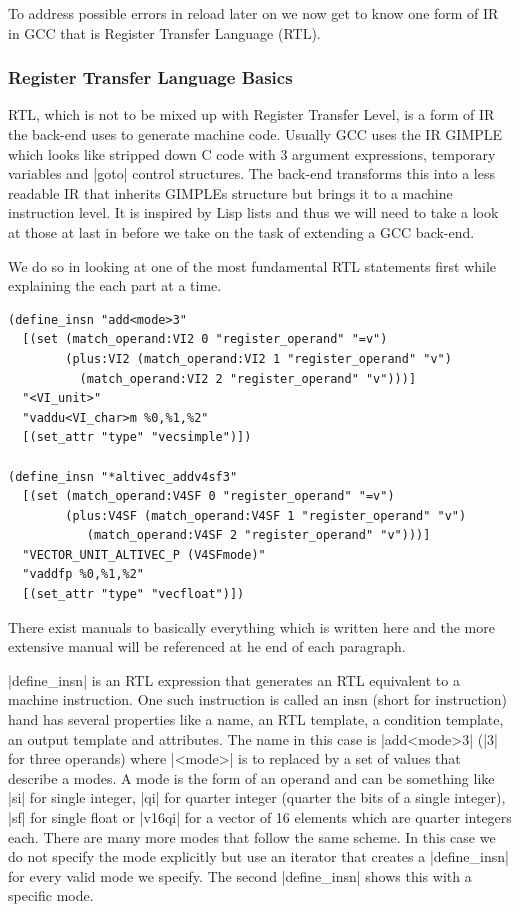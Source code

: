 To address possible errors in reload later on we now get to know one form of IR in GCC that is Register Transfer Language (RTL).

\subsubsection{Register Transfer Language Basics}
RTL, which is not to be mixed up with Register Transfer Level, is a form of IR the back-end uses to generate machine code.
Usually GCC uses the IR GIMPLE which looks like stripped down C code with 3 argument expressions, temporary variables and |goto| control structures.
The back-end transforms this into a less readable IR that inherits GIMPLEs structure but brings it to a machine instruction level.
It is inspired by Lisp lists and thus we will need to take a look at those at last in before we take on the task of extending a GCC back-end.

We do so in looking at one of the most fundamental RTL statements first while explaining the each part at a time.

\begin{lstlisting}
(define_insn "add<mode>3"
  [(set (match_operand:VI2 0 "register_operand" "=v")
        (plus:VI2 (match_operand:VI2 1 "register_operand" "v")
		  (match_operand:VI2 2 "register_operand" "v")))]
  "<VI_unit>"
  "vaddu<VI_char>m %0,%1,%2"
  [(set_attr "type" "vecsimple")])

(define_insn "*altivec_addv4sf3"
  [(set (match_operand:V4SF 0 "register_operand" "=v")
        (plus:V4SF (match_operand:V4SF 1 "register_operand" "v")
		   (match_operand:V4SF 2 "register_operand" "v")))]
  "VECTOR_UNIT_ALTIVEC_P (V4SFmode)"
  "vaddfp %0,%1,%2"
  [(set_attr "type" "vecfloat")])
\end{lstlisting}

There exist manuals to basically everything which is written here and the more extensive manual will be referenced at he end of each paragraph.

|define_insn| is an RTL expression that generates an RTL equivalent to a machine instruction.
One such instruction is called an insn (short for instruction) hand has several properties like a name, an RTL template, a condition template, an output template and attributes. \cite{GCCint:defineinsn}
The name in this case is |add<mode>3| (|3| for three operands) where |<mode>| is to replaced by a set of values that describe a modes. \cite{GCCint:stdnames}
A mode is the form of an operand and can be something like |si| for single integer, |qi| for quarter integer (quarter the bits of a single integer), |sf| for single float or |v16qi| for a vector of 16 elements which are quarter integers each. \cite{GCCint:modes}
There are many more modes that follow the same scheme.
In this case we do not specify the mode explicitly but use an iterator that creates a |define_insn| for every valid mode we specify. \cite{GCCint:iterator}
The second |define_insn| shows this with a specific mode.

